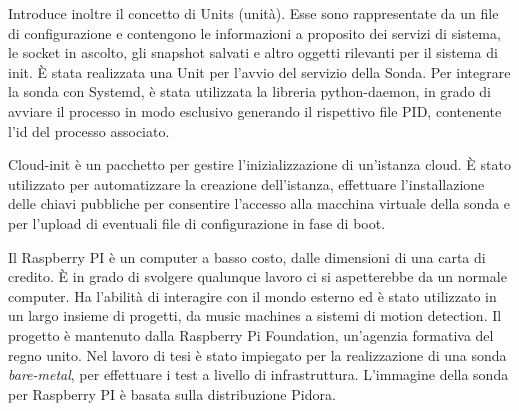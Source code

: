 \documentclass[../main.tex]{subfiles}
\begin{document}
\begin{description}[nolistsep]
Introduce inoltre il concetto di Units (unità). Esse sono rappresentate da un file di configurazione e contengono le informazioni a proposito dei servizi di sistema, le socket in ascolto, gli snapshot salvati e altro oggetti rilevanti per il sistema di init.
\newline
\`E stata realizzata una Unit per l'avvio del servizio della Sonda. Per integrare la sonda con Systemd, è stata utilizzata la libreria python-daemon, in grado di avviare il processo in modo esclusivo generando il rispettivo file PID, contenente l'id del processo associato.
\item[Cloud-init]
Cloud-init è un pacchetto per gestire l'inizializzazione di un'istanza cloud.
\newline
\`E stato utilizzato per automatizzare la creazione dell'istanza, effettuare l'installazione delle chiavi pubbliche per consentire l'accesso alla macchina virtuale della sonda e per l'upload di eventuali file di configurazione in fase di boot.
\item[Raspberry PI]
Il Raspberry PI è un computer a basso costo, dalle dimensioni di una carta di credito. \`E in grado di svolgere qualunque lavoro ci si aspetterebbe da un normale computer. Ha l'abilità di interagire con il mondo esterno ed è stato utilizzato in un largo insieme di progetti, da music machines a sistemi di motion detection.
Il progetto è mantenuto dalla Raspberry Pi Foundation, un'agenzia formativa del regno unito.
\newline
Nel lavoro di tesi è stato impiegato per la realizzazione di una sonda \textit{bare-metal}, per effettuare i test a livello di infrastruttura.
L'immagine della sonda per Raspberry PI è basata sulla distribuzione Pidora.
\end{description}
\end{document}
